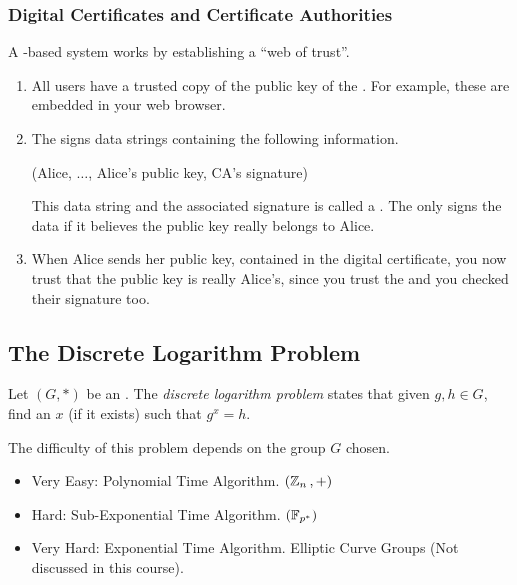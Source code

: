 \subsubsection{Digital Certificates and Certificate Authorities}\label{subsubsec:Digital_Certificate_Certificate_Authorities}
A -based system works by establishing a ``web of trust''.
\begin{enumerate}[noitemsep]
\item All users have a trusted copy of the public key of the \textbf{}. For example, these are embedded in your web browser.
\item The  signs data strings containing the following information.
  \begin{center}
    (Alice, $\ldots$, Alice's public key, CA's signature)
  \end{center}
  This data string and the associated signature is called a .
  The  only signs the data if it believes the public key really belongs to Alice.
\item When Alice sends her public key, contained in the digital certificate, you now trust that the public key is really Alice's, since you trust the  and you checked their signature too.
\end{enumerate}

\subsection{The Discrete Logarithm Problem}\label{subsec:Discrete_Log_Problem}
\begin{definition}\label{def:Discrete_Log_Problem}
  Let $(G, *)$ be an  .
  The \emph{discrete logarithm problem} states that given $g, h \in G$, find an $x$ (if it exists) such that $g^{x} = h$.

  The difficulty of this problem depends on the group $G$ chosen.
  \begin{itemize}[noitemsep]
  \item Very Easy: Polynomial Time Algorithm. $(\operatorname{\mathbb{Z}}_{n}{}, +)$
  \item Hard: Sub-Exponential Time Algorithm. $(\mathbb{F}_{p^{*}})$
  \item Very Hard: Exponential Time Algorithm. Elliptic Curve Groups (Not discussed in this course).
  \end{itemize}
\end{definition}

